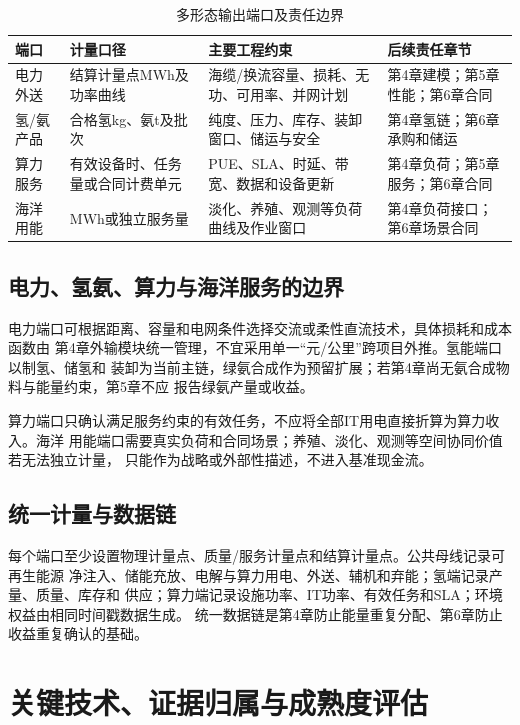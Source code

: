 \begin{table}[H]
\centering
\caption{多形态输出端口及责任边界}
\label{tab:c3-output-ports}
\begin{tabularx}{\textwidth}{p{2.2cm} p{2.3cm} X X}
\toprule
端口 & 计量口径 & 主要工程约束 & 后续责任章节\\
\midrule
电力外送 & 结算计量点MWh及功率曲线 & 海缆/换流容量、损耗、无功、可用率、并网计划 & 第4章建模；第5章性能；第6章合同\\
氢/氨产品 & 合格氢kg、氨t及批次 & 纯度、压力、库存、装卸窗口、储运与安全 & 第4章氢链；第6章承购和储运\\
算力服务 & 有效设备时、任务量或合同计费单元 & PUE、SLA、时延、带宽、数据和设备更新 & 第4章负荷；第5章服务；第6章合同\\
海洋用能 & MWh或独立服务量 & 淡化、养殖、观测等负荷曲线及作业窗口 & 第4章负荷接口；第6章场景合同\\
\bottomrule
\end{tabularx}
\end{table}

\subsection{电力、氢氨、算力与海洋服务的边界}

电力端口可根据距离、容量和电网条件选择交流或柔性直流技术，具体损耗和成本函数由
第4章外输模块统一管理，不宜采用单一“元/公里”跨项目外推。氢能端口以制氢、储氢和
装卸为当前主链，绿氨合成作为预留扩展；若第4章尚无氨合成物料与能量约束，第5章不应
报告绿氨产量或收益。

算力端口只确认满足服务约束的有效任务，不应将全部IT用电直接折算为算力收入。海洋
用能端口需要真实负荷和合同场景；养殖、淡化、观测等空间协同价值若无法独立计量，
只能作为战略或外部性描述，不进入基准现金流。

\subsection{统一计量与数据链}

每个端口至少设置物理计量点、质量/服务计量点和结算计量点。公共母线记录可再生能源
净注入、储能充放、电解与算力用电、外送、辅机和弃能；氢端记录产量、质量、库存和
供应；算力端记录设施功率、IT功率、有效任务和SLA；环境权益由相同时间戳数据生成。
统一数据链是第4章防止能量重复分配、第6章防止收益重复确认的基础。

\section{关键技术、证据归属与成熟度评估}

